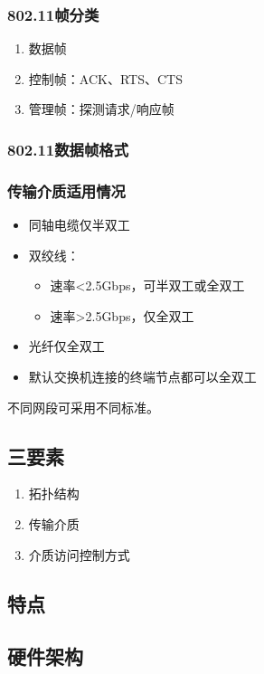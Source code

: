 \subsubsection{802.11帧分类}
\begin{enumerate}
    \item 数据帧
    \item 控制帧：ACK、RTS、CTS
    \item 管理帧：探测请求/响应帧
\end{enumerate}


\subsubsection{802.11数据帧格式}



\subsubsection{传输介质适用情况}
\begin{itemize}
    \item 同轴电缆仅半双工
    \item 双绞线：\begin{itemize}
        \item 速率<2.5Gbps，可半双工或全双工
        \item 速率>2.5Gbps，仅全双工
    \end{itemize}
    \item 光纤仅全双工
    \item 默认交换机连接的终端节点都可以全双工
\end{itemize}
不同网段可采用不同标准。


\subsection{三要素}
\begin{enumerate}
    \item 拓扑结构
    \item 传输介质
    \item 介质访问控制方式
\end{enumerate}


\subsection{特点}


\subsection{硬件架构}


